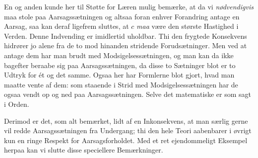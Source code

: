 \documentclass[12pt,a4paper]{article}
\newcommand{\opage}[1]{\marginnote{\footnotesize\textit{[#1]}}}
\begin{document}
En og anden kunde her til Støtte for Læren mulig bemærke, at da vi
\emph{nødvendigvis} maa stole paa Aarsagssætningen og altsaa foran enhver
Forandring antage en Aarsag, saa kan deraf ligefrem sluttes, at $c$ \emph{maa}
være den største Hastighed i Verden. Denne Indvending er imidlertid uholdbar.
Thi den frygtede Konsekvens hidrører jo alene fra de to mod hinanden stridende
Forudsætninger. Men ved at antage dem har man brudt med Modsigelsessætningen,
og man kan da ikke bagefter beraabe sig paa Aarsagssætningen, da disse to
Sætninger blot er to Udtryk for ét og det samme. Ogsaa her har Formlerne blot
gjort, hvad man maatte vente af dem: som staaende i Strid med
Modsigelsessætningen har de ogsaa vendt op og ned paa Aarsagssætningen. Selve
det matematiske er som sagt i Orden.

\opage{28} Derimod er det, som alt bemærket, lidt af en Inkonsekvens, at man særlig gerne
vil redde Aarsagssætningen fra Undergang; thi den hele Teori aabenbarer i
øvrigt kun en ringe Respekt for Aarsagsforholdet. Med et ret ejendommeligt
Eksempel herpaa kan vi slutte disse speciellere Bemærkninger.
\end{document}
